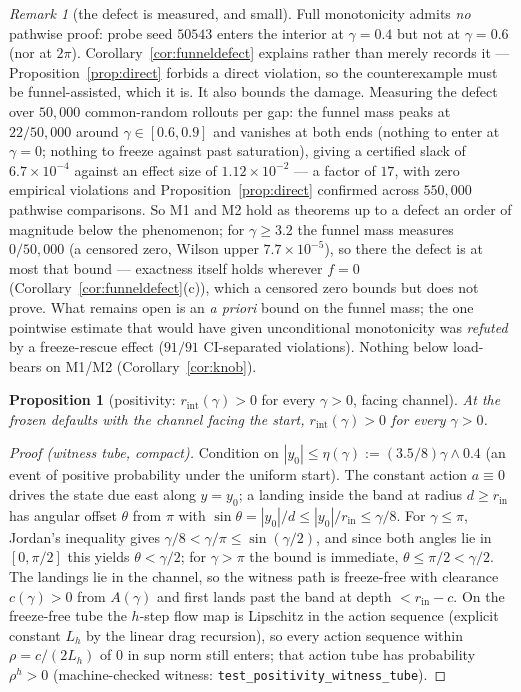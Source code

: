 \documentclass[11pt]{article}
\newtheorem{proposition}{Proposition}
\theoremstyle{remark}
\newtheorem{remark}{Remark}
\begin{document}
\begin{remark}[the defect is measured, and small]
\label{rem:certificate}
Full monotonicity admits \emph{no} pathwise proof: probe seed $50543$
enters the interior at $\gamma = 0.4$ but not at $\gamma = 0.6$ (nor at
$2\pi$). Corollary~\ref{cor:funneldefect} explains rather than merely
records it --- Proposition~\ref{prop:direct} forbids a direct violation,
so the counterexample must be funnel-assisted, which it is. It also
bounds the damage. Measuring the defect over $50{,}000$ common-random
rollouts per gap: the funnel mass peaks at $22/50{,}000$ around
$\gamma \in [0.6, 0.9]$ and vanishes at both ends (nothing to enter at
$\gamma = 0$; nothing to freeze against past saturation), giving a
certified slack of $6.7 \times 10^{-4}$ against an effect size of
$1.12 \times 10^{-2}$ --- a factor of $17$, with zero empirical
violations and Proposition~\ref{prop:direct} confirmed across
$550{,}000$ pathwise comparisons. So M1 and M2 hold as theorems up to a
defect an order of magnitude below the phenomenon; for
$\gamma \ge 3.2$ the funnel mass measures $0/50{,}000$ (a censored zero,
Wilson upper $7.7 \times 10^{-5}$), so there the defect is at most that
bound --- exactness itself holds wherever $f = 0$
(Corollary~\ref{cor:funneldefect}(c)), which a censored zero bounds but
does not prove. What remains open
is an \emph{a priori} bound on the funnel mass; the one pointwise
estimate that would have given unconditional monotonicity was
\emph{refuted} by a freeze-rescue effect ($91/91$ CI-separated
violations). Nothing below load-bears on M1/M2 (Corollary~\ref{cor:knob}).
\end{remark}

\begin{proposition}[positivity: $r_{\mathrm{int}}(\gamma) > 0$ for every
$\gamma > 0$, facing channel]
\label{prop:positivity}
At the frozen defaults with the channel facing the start,
$r_{\mathrm{int}}(\gamma) > 0$ for every $\gamma > 0$.
\end{proposition}
\begin{proof}[Proof (witness tube, compact)]
Condition on $|y_0| \le \eta(\gamma) := (3.5/8)\gamma \wedge 0.4$ (an
event of positive probability under the uniform start). The constant
action $a \equiv 0$ drives the state due east along $y = y_0$; a landing
inside the band at radius $d \ge r_{\mathrm{in}}$ has angular offset
$\theta$ from $\pi$ with
$\sin\theta = |y_0|/d \le |y_0|/r_{\mathrm{in}} \le \gamma/8$. For
$\gamma \le \pi$, Jordan's inequality gives
$\gamma/8 < \gamma/\pi \le \sin(\gamma/2)$, and since both angles lie in
$[0, \pi/2]$ this yields $\theta < \gamma/2$; for $\gamma > \pi$ the
bound is immediate, $\theta \le \pi/2 < \gamma/2$. The landings lie in
the channel, so
the witness path is freeze-free with clearance
$c(\gamma) > 0$ from $A(\gamma)$ and first lands past the band at depth
$< r_{\mathrm{in}} - c$. On the freeze-free tube the $h$-step flow map is
Lipschitz in the action sequence (explicit constant $L_h$ by the linear
drag recursion), so every action sequence within
$\rho = c/(2 L_h)$ of $0$ in sup norm still enters; that action tube has
probability $\rho^h > 0$ (machine-checked witness:
\texttt{test\_positivity\_witness\_tube}).
\end{proof}
\end{document}
